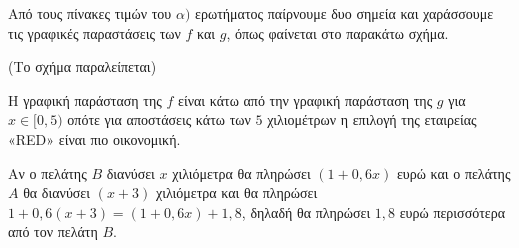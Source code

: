 \begin{alist}
\item Από τους πίνακες τιμών του $\alpha)$ ερωτήματος παίρνουμε δυο σημεία και χαράσσουμε τις
γραφικές παραστάσεις των $f$ και $g$, όπως φαίνεται στο παρακάτω σχήμα.

(Το σχήμα παραλείπεται)

Η γραφική παράσταση της $f$ είναι κάτω από την γραφική παράσταση της $g$ για $x \in [0, 5)$
οπότε για αποστάσεις κάτω των $5$ χιλιομέτρων η επιλογή της εταιρείας «RED» είναι πιο
οικονομική.

\item Αν ο πελάτης $B$ διανύσει $x$ χιλιόμετρα θα πληρώσει $(1 + 0,6x)$ ευρώ και ο πελάτης $A$
θα διανύσει $(x + 3)$ χιλιόμετρα και θα πληρώσει $1 + 0,6(x + 3) = (1 + 0,6x) + 1,8$, δηλαδή θα
πληρώσει $1,8$ ευρώ περισσότερα από τον πελάτη $B$.
\end{alist}

